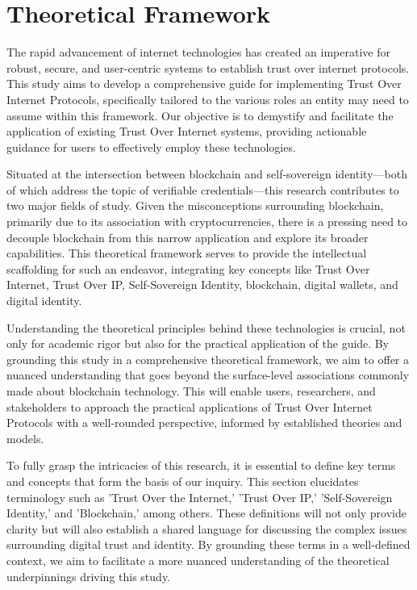 \section{Theoretical Framework}

The rapid advancement of internet technologies has created an imperative for robust, secure, and user-centric systems to establish trust over internet protocols. This study aims to develop a comprehensive guide for implementing Trust Over Internet Protocols, specifically tailored to the various roles an entity may need to assume within this framework. Our objective is to demystify and facilitate the application of existing Trust Over Internet systems, providing actionable guidance for users to effectively employ these technologies.

Situated at the intersection between blockchain and self-sovereign identity—both of which address the topic of verifiable credentials—this research contributes to two major fields of study. Given the misconceptions surrounding blockchain, primarily due to its association with cryptocurrencies, there is a pressing need to decouple blockchain from this narrow application and explore its broader capabilities. This theoretical framework serves to provide the intellectual scaffolding for such an endeavor, integrating key concepts like Trust Over Internet, Trust Over IP, Self-Sovereign Identity, blockchain, digital wallets, and digital identity.

Understanding the theoretical principles behind these technologies is crucial, not only for academic rigor but also for the practical application of the guide. By grounding this study in a comprehensive theoretical framework, we aim to offer a nuanced understanding that goes beyond the surface-level associations commonly made about blockchain technology. This will enable users, researchers, and stakeholders to approach the practical applications of Trust Over Internet Protocols with a well-rounded perspective, informed by established theories and models.

To fully grasp the intricacies of this research, it is essential to define key terms and concepts that form the basis of our inquiry. This section elucidates terminology such as 'Trust Over the Internet,' 'Trust Over IP,' 'Self-Sovereign Identity,' and 'Blockchain,' among others. These definitions will not only provide clarity but will also establish a shared language for discussing the complex issues surrounding digital trust and identity. By grounding these terms in a well-defined context, we aim to facilitate a more nuanced understanding of the theoretical underpinnings driving this study.

